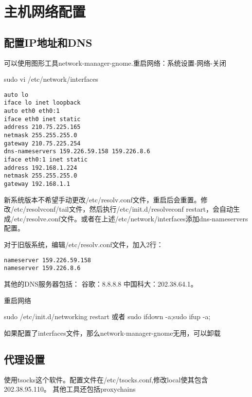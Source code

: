 \section{主机网络配置}
\label{netconfig}
\subsection{配置IP地址和DNS}
可以使用图形工具network-manager-gnome.重启网络：系统设置-网络-关闭
\begin{shellcmd}
sudo vi /etc/network/interfaces 
\end{shellcmd}
\begin{verbatim}
auto lo
iface lo inet loopback
auto eth0 eth0:1
iface eth0 inet static
address 210.75.225.165
netmask 255.255.255.0
gateway 210.75.225.254
dns-nameservers 159.226.59.158 159.226.8.6
iface eth0:1 inet static
address 192.168.1.224
netmask 255.255.255.0
gateway 192.168.1.1
\end{verbatim}

新系统版本不希望手动更改/etc/resolv.conf文件，重启后会重置。修改/etc/resolvconf/tail文件，然后执行/etc/init.d/resolveconf restart，会自动生成/etc/resolve.conf文件。或者在上述/etc/network/interfaces添加dns-nameservers配置。

对于旧版系统，编辑/etc/resolv.conf文件，加入2行： 
\begin{verbatim}
nameserver 159.226.59.158
nameserver 159.226.8.6
\end{verbatim}
其他的DNS服务器包括：
谷歌：8.8.8.8
中国科大：202.38.64.1。


重启网络
\begin{shellcmd}
sudo /etc/init.d/networking restart
或者 sudo ifdown -a;sudo ifup -a;
\end{shellcmd}
如果配置了interfaces文件，那么network-manager-gnome无用，可以卸载

\subsection{代理设置}
使用tsocks这个软件。配置文件在/etc/tsocks.conf,修改local使其包含202.38.95.110。
其他工具还包括proxychains




